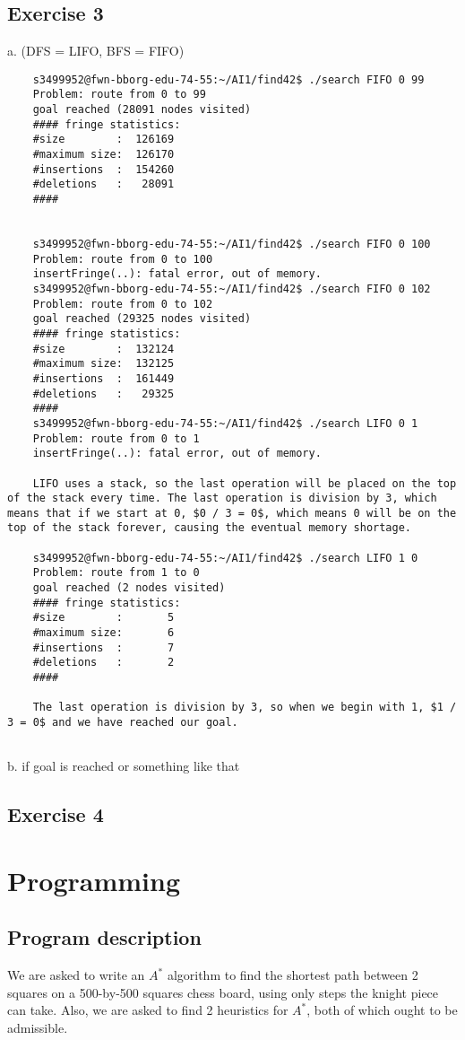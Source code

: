 \documentclass{article}
\begin{document}
	\subsection*{Exercise 3}
	a. (DFS = LIFO, BFS = FIFO)
	\begin{verbatim}
	s3499952@fwn-bborg-edu-74-55:~/AI1/find42$ ./search FIFO 0 99
	Problem: route from 0 to 99
	goal reached (28091 nodes visited)
	#### fringe statistics:
	#size        :  126169
	#maximum size:  126170
	#insertions  :  154260
	#deletions   :   28091
	####
	
	
	s3499952@fwn-bborg-edu-74-55:~/AI1/find42$ ./search FIFO 0 100
	Problem: route from 0 to 100
	insertFringe(..): fatal error, out of memory.
	s3499952@fwn-bborg-edu-74-55:~/AI1/find42$ ./search FIFO 0 102
	Problem: route from 0 to 102
	goal reached (29325 nodes visited)
	#### fringe statistics:
	#size        :  132124
	#maximum size:  132125
	#insertions  :  161449
	#deletions   :   29325
	####
	s3499952@fwn-bborg-edu-74-55:~/AI1/find42$ ./search LIFO 0 1
	Problem: route from 0 to 1
	insertFringe(..): fatal error, out of memory.
	
	LIFO uses a stack, so the last operation will be placed on the top of the stack every time. The last operation is division by 3, which means that if we start at 0, $0 / 3 = 0$, which means 0 will be on the top of the stack forever, causing the eventual memory shortage.
	
	s3499952@fwn-bborg-edu-74-55:~/AI1/find42$ ./search LIFO 1 0
	Problem: route from 1 to 0
	goal reached (2 nodes visited)
	#### fringe statistics:
	#size        :       5
	#maximum size:       6
	#insertions  :       7
	#deletions   :       2
	####
	
	The last operation is division by 3, so when we begin with 1, $1 / 3 = 0$ and we have reached our goal.
	
	\end{verbatim}
	
	b. if goal is reached or something like that 
	
	\subsection*{Exercise 4}
	
	
	\section*{Programming} 
	\subsection*{Program description}
	We are asked to write an $A^*$ algorithm to find the shortest path between 2 squares on a 500-by-500 squares chess board, using only steps the knight piece can take. Also, we are asked to find 2 heuristics for $A^*$, both of which ought to be admissible.
	
\end{document}
